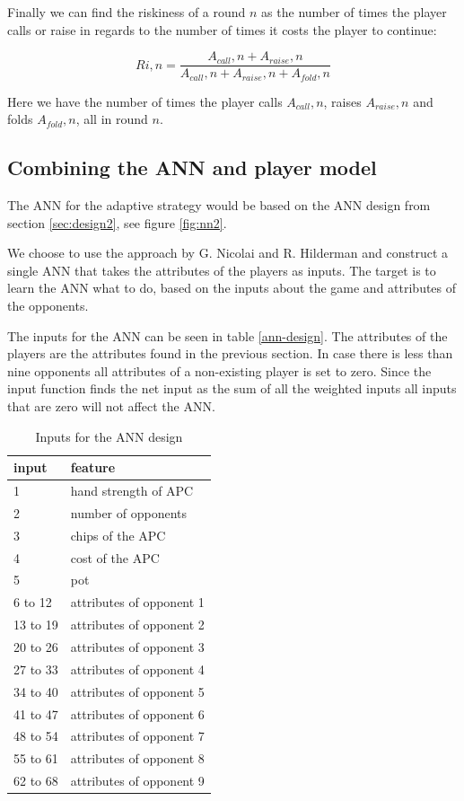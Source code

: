 Finally we can find the riskiness of a round $n$ as the number of times the player calls or raise in regards to the number of times it costs the player to continue:

\[Ri,n = \frac{A_{call},n + A_{raise},n}{A_{call},n + A_{raise},n + A_{fold},n}\]

Here we have the number of times the player calls $A_{call},n$, raises $A_{raise},n$ and folds $A_{fold},n$, all in round $n$.

\subsection{Combining the ANN and player model}
The ANN for the adaptive strategy would be based on the ANN design from section \ref{sec:design2}, see figure \ref{fig:nn2}. 



We choose to use the approach by G. Nicolai and R. Hilderman and construct a single ANN that takes the attributes of the players as inputs. The target is to learn the ANN what to do, based on the inputs about the game and attributes of the opponents.

The inputs for the ANN can be seen in table \ref{ann-design}. The attributes of the players are the attributes found in the previous section. In case there is less than nine opponents all attributes of a non-existing player is set to zero. Since the input function finds the net input as the sum of all the weighted inputs all inputs that are zero will not affect the ANN.

\begin{table}[H]
\center
\begin{tabular}{ | l | l | }
\hline
input & feature \\
\hline
1 & hand strength of APC\\
2 & number of opponents\\
3 & chips of the APC\\
4 & cost of the APC\\
5 & pot\\
6 to 12 & attributes of opponent 1\\
13 to 19 & attributes of opponent 2\\
20 to 26 & attributes of opponent 3\\
27 to 33 & attributes of opponent 4\\
34 to 40 & attributes of opponent 5\\
41 to 47 & attributes of opponent 6\\
48 to 54 & attributes of opponent 7\\
55 to 61 & attributes of opponent 8\\
62 to 68 & attributes of opponent 9\\
\hline
\end{tabular}
\caption{Inputs for the ANN design \label{tab:ann-design}}
\end{table} 

